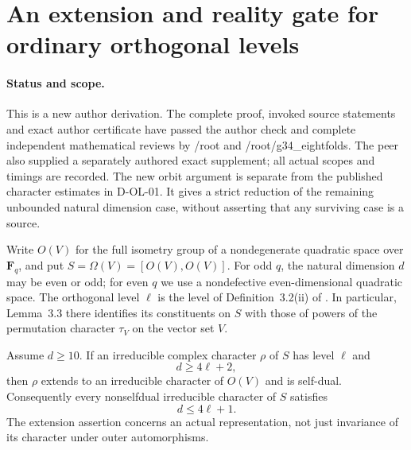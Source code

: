 \section{An extension and reality gate for ordinary orthogonal levels}
\label{sec:orthogonal-lowlevel-reality}

\paragraph{Status and scope.}
This is a new author derivation.  The complete proof, invoked source
statements and exact author certificate have passed the author check
and complete independent mathematical reviews by /root and
/root/g34\_eightfolds. The peer also supplied a separately authored
exact supplement; all actual scopes and timings are recorded.  The new orbit argument is separate
from the published character estimates in D-OL-01.  It gives a strict
reduction of the remaining unbounded natural dimension case, without
asserting that any surviving case is a source.

Write $O(V)$ for the full isometry group of a nondegenerate quadratic
space over $\mathbf F_q$, and put $S=\Omega(V)=[O(V),O(V)]$.
For odd $q$, the natural dimension $d$ may be even or odd; for even $q$
we use a nondefective even-dimensional quadratic space.  The
orthogonal level $\ell$ is the level of Definition~3.2(ii) of
\cite{OL:GLT2024}.  In particular, Lemma~3.3 there identifies its
constituents on $S$ with those of powers of the permutation character
$\tau_V$ on the vector set $V$.

\begin{lemma}
\label{D-OL-04}
Assume $d\ge10$.  If an irreducible complex character $\rho$ of $S$
has level $\ell$ and
\[
                         d\ge4\ell+2,                         \tag{OL4.1}
\]
then $\rho$ extends to an irreducible character of $O(V)$ and is
self-dual.  Consequently every nonselfdual irreducible character of
$S$ satisfies
\[
                         d\le4\ell+1.                         \tag{OL4.2}
\]
The extension assertion concerns an actual representation, not just
invariance of its character under outer automorphisms.
\end{lemma}

